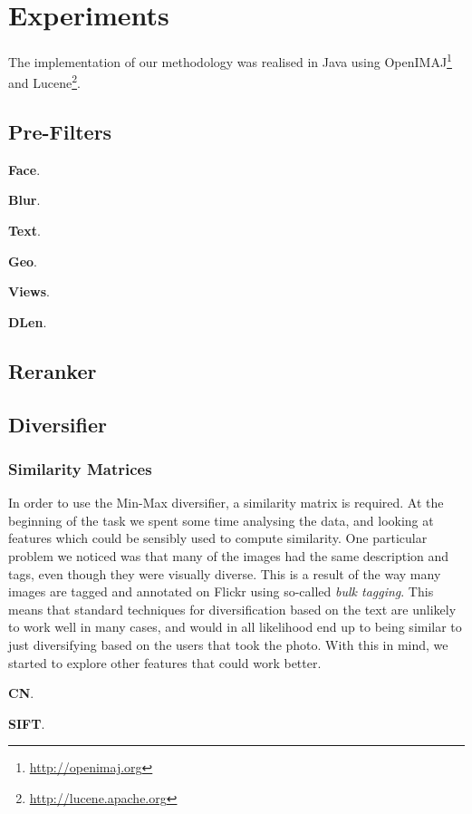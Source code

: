 \documentclass{../acm_proc_article-me11_tweaked}
\begin{document}
\section{Experiments}\label{sec:exp}
The implementation of our methodology was realised in Java using OpenIMAJ\footnote{\url{http://openimaj.org}}~\cite{Hare:2011:OIJ:2072298.2072421} and Lucene\footnote{\url{http://lucene.apache.org}}. 

\subsection{Pre-Filters}

\noindent \textbf{Face}.

\noindent \textbf{Blur}.

\noindent \textbf{Text}.

\noindent \textbf{Geo}.

\noindent \textbf{Views}.

\noindent \textbf{DLen}.

\subsection{Reranker}

\subsection{Diversifier}

\subsubsection{Similarity Matrices}
In order to use the Min-Max diversifier, a similarity matrix is required. At the beginning of the task we spent some time analysing the data, and looking at features which could be sensibly used  to compute similarity. One particular problem we noticed was that many of the images had the same description and tags, even though they were visually diverse. This is a result of the way many images are tagged and annotated on Flickr using so-called \emph{bulk tagging}. This means that standard techniques for diversification based on the text are unlikely to work well in many cases, and would in all likelihood end up to being similar to just diversifying based on the users that took the photo. With this in mind, we started to explore other features that could work better. 

\noindent \textbf{CN}.

\noindent \textbf{SIFT}.
\end{document}
